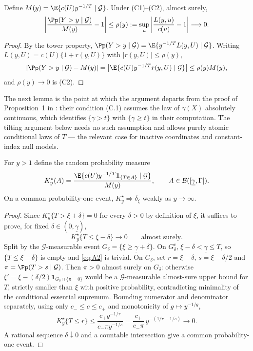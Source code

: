 \begin{lemma}\label{lem:app-remainder}
Define $M(y)=\E\{c(U)y^{-1/T}\mid\mathcal G\}$.  Under (C1)--(C2), almost
surely,
\begin{equation}
 \left|\frac{\Pp(Y>y\mid\mathcal G)}{M(y)}-1\right|
 \le\rho(y):=\sup_u\left|\frac{L(y,u)}{c(u)}-1\right|\longrightarrow0.
 \label{eq:A1}
\end{equation}
\end{lemma}

\begin{proof}
By the tower property,
$\Pp(Y>y\mid\mathcal G)=\E\{y^{-1/T}L(y,U)\mid\mathcal G\}$.  Writing
$L(y,U)=c(U)\{1+r(y,U)\}$ with $|r(y,U)|\le\rho(y)$,
\[
 |\Pp(Y>y\mid\mathcal G)-M(y)|
 =\bigl|\E\{c(U)y^{-1/T}r(y,U)\mid\mathcal G\}\bigr|
 \le\rho(y)M(y),
\]
and $\rho(y)\to0$ is (C2).
\end{proof}

The next lemma is the point at which the argument departs from the proof of
Proposition~1 in \citet{gardesPodgorny2025}: their condition (C.1) assumes
the law of $\gamma(X)$ absolutely continuous, which identifies
$\{\gamma>t\}$ with $\{\gamma\ge t\}$ in their computation.  The tilting
argument below needs no such assumption and allows purely atomic
conditional laws of $T$ --- the relevant case for inactive coordinates and
constant-index null models.

\begin{lemma}\label{lem:app-tilt}
For $y>1$ define the random probability measure
\[
 K_y^\star(A)=
 \frac{\E\{c(U)y^{-1/T}\mathbf 1_{\{T\in A\}}\mid\mathcal G\}}{M(y)},
 \qquad A\in\mathcal B([\underline\gamma,\Gamma]).
\]
On a common probability-one event, $K_y^\star\Rightarrow\delta_\xi$ weakly
as $y\to\infty$.
\end{lemma}

\begin{proof}
Since $K_y^\star\{T>\xi+\delta\}=0$ for every $\delta>0$ by definition of
$\xi$, it suffices to prove, for fixed
$\delta\in(0,\underline\gamma)$,
\begin{equation}
 K_y^\star\{T\le\xi-\delta\}\longrightarrow0\qquad\text{almost surely.}
 \label{eq:A2}
\end{equation}
Split by the $\mathcal G$-measurable event
$G_\delta=\{\xi\ge\underline\gamma+\delta\}$.  On $G_\delta^c$,
$\xi-\delta<\underline\gamma\le T$, so $\{T\le\xi-\delta\}$ is empty and
\eqref{eq:A2} is trivial.  On $G_\delta$, set $r=\xi-\delta$,
$s=\xi-\delta/2$ and $\pi=\Pp(T>s\mid\mathcal G)$.  Then $\pi>0$ almost
surely on $G_\delta$: otherwise
$\xi'=\xi-(\delta/2)\mathbf 1_{G_\delta\cap\{\pi=0\}}$ would be a
$\mathcal G$-measurable almost-sure upper bound for $T$, strictly smaller
than $\xi$ with positive probability, contradicting minimality of the
conditional essential supremum.  Bounding numerator and denominator
separately, using only $c_-\le c\le c_+$ and monotonicity of
$g\mapsto y^{-1/g}$,
\[
 K_y^\star\{T\le r\}
 \le\frac{c_+y^{-1/r}}{c_-\pi y^{-1/s}}
 =\frac{c_+}{c_-\pi}\,y^{-(1/r-1/s)}\longrightarrow0.
\]
A rational sequence $\delta\downarrow0$ and a countable intersection give
a common probability-one event.
\end{proof}

